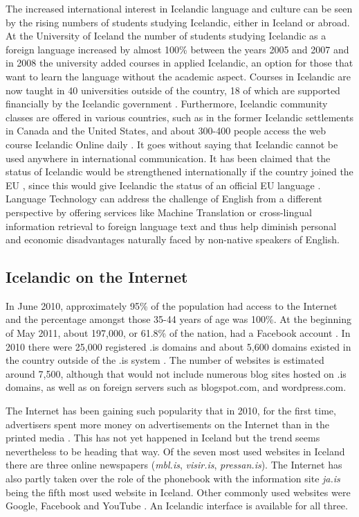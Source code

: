 \documentclass{../../metanetpaper}
\begin{document}
\begin{multicols}{2}
The increased international interest in Icelandic language and culture can be seen by the rising numbers of students studying Icelandic, either in Iceland or abroad. At the University of Iceland the number of students studying Icelandic as a foreign language increased by almost 100\% between the years 2005 and 2007 and in 2008 the university added courses in applied Icelandic, an option for those that want to learn the language without the academic aspect. Courses in Icelandic are now taught in 40 universities outside of the country, 18 of which are supported financially by the Icelandic government \cite{isl1}.  Furthermore, Icelandic community classes are offered in various countries, such as in the former Icelandic settlements in Canada and the United States, and about 300-400 people access the web course Icelandic Online daily \cite{iol1}. 
It goes without saying that Icelandic cannot be used anywhere in international communication. It has been claimed that the status of Icelandic would be strengthened internationally if the country joined the EU \cite{vis1}, since this would give Icelandic the status of an official EU language \cite{enl1}. Language Technology can address the challenge of English from a different perspective by offering services like Machine Translation or cross-lingual information retrieval to foreign language text and thus help diminish personal and economic disadvantages naturally faced by non-native speakers of English.

\subsection{Icelandic on the Internet}

In June 2010, approximately 95\% of the population had access to the Internet \cite{sta1} and the percentage amongst those 35-44 years of age was 100\%. At the beginning of May 2011, about 197,000, or 61.8\% of the nation, had a Facebook account \cite{fac1}.  
In 2010 there were 25,000 registered .is domains \cite{len1} and about 5,600 domains existed in the country outside of the .is system \cite{len2}. The number of websites is estimated around 7,500, although that would not include numerous blog sites hosted on .is domains, as well as on foreign servers such as blogspot.com, and wordpress.com. 

The Internet has been gaining such popularity that in 2010, for the first time, advertisers spent more money on advertisements on the Internet than in the printed media \cite{abs1}. This has not yet happened in Iceland but the trend seems nevertheless to be heading that way. Of the seven most used websites in Iceland there are three online newspapers (\textit{mbl.is}, \textit{visir.is}, \textit{pressan.is}). The Internet has also partly taken over the role of the phonebook with the information site \textit{ja.is} being the fifth most used website in Iceland. Other commonly used websites were Google, Facebook and YouTube \cite{abs2}. An Icelandic interface is available for all three.


\end{multicols}
\end{document}
